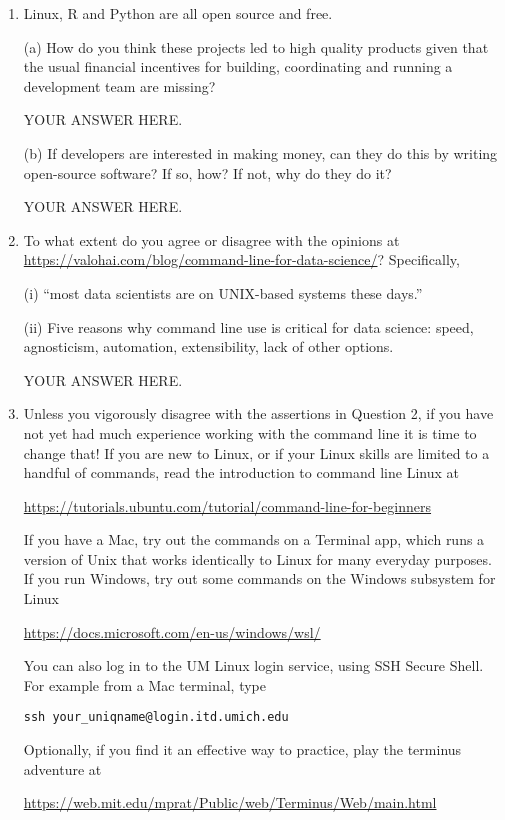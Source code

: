 \documentclass[12pt]{article}
\begin{document}
\begin{enumerate}

\item Linux, R and Python are all open source and free. 

(a) How do you think these projects led to high quality products given that the  usual financial incentives for building, coordinating and running a development team are missing?

YOUR ANSWER HERE.

(b) If developers are interested in making money, can they do this by writing open-source software? If so, how? If not, why do they do it?

YOUR ANSWER HERE.
  
\item To what extent do you agree or disagree with the opinions at
\url{https://valohai.com/blog/command-line-for-data-science/}?
Specifically,

(i) ``most data scientists are on UNIX-based systems these days.''

(ii) Five reasons why command line use is critical for data science: speed, agnosticism, automation, extensibility, lack of other options.


YOUR ANSWER HERE.

\item Unless you vigorously disagree with the assertions in Question 2, if you have not yet had much experience working with the command line it is time to change that! If you are new to Linux, or if your Linux skills are limited to a handful of commands, read the introduction to command line Linux at
  
\url{https://tutorials.ubuntu.com/tutorial/command-line-for-beginners}

If you have a Mac, try out the commands on a Terminal app, which runs a version of Unix that works identically to Linux for many everyday purposes. If you run Windows, try out some commands on the Windows subsystem for Linux

\url{https://docs.microsoft.com/en-us/windows/wsl/}

You can also log in to the UM Linux login service, using SSH Secure Shell. For example from a Mac terminal, type

\texttt{ssh your\_uniqname@login.itd.umich.edu}

Optionally, if you find it an effective way to practice, play the terminus adventure at

\url{https://web.mit.edu/mprat/Public/web/Terminus/Web/main.html}


\end{enumerate}
\end{document}
